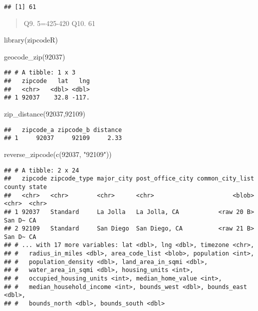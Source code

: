 \documentclass[
]{article}
\newenvironment{Shaded}{\begin{snugshade}}{\end{snugshade}}
\newcommand{\FunctionTok}[1]{\textcolor[rgb]{0.00,0.00,0.00}{#1}}
\newcommand{\NormalTok}[1]{#1}
\newcommand{\StringTok}[1]{\textcolor[rgb]{0.31,0.60,0.02}{#1}}
\begin{document}
\begin{verbatim}
## [1] 61
\end{verbatim}

\begin{quote}
Q9. 5=425-420 Q10. 61
\end{quote}

\begin{Shaded}
\begin{Highlighting}[]
\FunctionTok{library}\NormalTok{(zipcodeR)}
\end{Highlighting}
\end{Shaded}

\begin{Shaded}
\begin{Highlighting}[]
\FunctionTok{geocode\_zip}\NormalTok{(}\StringTok{\textquotesingle{}92037\textquotesingle{}}\NormalTok{)}
\end{Highlighting}
\end{Shaded}

\begin{verbatim}
## # A tibble: 1 x 3
##   zipcode   lat   lng
##   <chr>   <dbl> <dbl>
## 1 92037    32.8 -117.
\end{verbatim}

\begin{Shaded}
\begin{Highlighting}[]
\FunctionTok{zip\_distance}\NormalTok{(}\StringTok{\textquotesingle{}92037\textquotesingle{}}\NormalTok{,}\StringTok{\textquotesingle{}92109\textquotesingle{}}\NormalTok{)}
\end{Highlighting}
\end{Shaded}

\begin{verbatim}
##   zipcode_a zipcode_b distance
## 1     92037     92109     2.33
\end{verbatim}

\begin{Shaded}
\begin{Highlighting}[]
\FunctionTok{reverse\_zipcode}\NormalTok{(}\FunctionTok{c}\NormalTok{(}\StringTok{\textquotesingle{}92037\textquotesingle{}}\NormalTok{, }\StringTok{"92109"}\NormalTok{))}
\end{Highlighting}
\end{Shaded}

\begin{verbatim}
## # A tibble: 2 x 24
##   zipcode zipcode_type major_city post_office_city common_city_list county state
##   <chr>   <chr>        <chr>      <chr>                      <blob> <chr>  <chr>
## 1 92037   Standard     La Jolla   La Jolla, CA           <raw 20 B> San D~ CA   
## 2 92109   Standard     San Diego  San Diego, CA          <raw 21 B> San D~ CA   
## # ... with 17 more variables: lat <dbl>, lng <dbl>, timezone <chr>,
## #   radius_in_miles <dbl>, area_code_list <blob>, population <int>,
## #   population_density <dbl>, land_area_in_sqmi <dbl>,
## #   water_area_in_sqmi <dbl>, housing_units <int>,
## #   occupied_housing_units <int>, median_home_value <int>,
## #   median_household_income <int>, bounds_west <dbl>, bounds_east <dbl>,
## #   bounds_north <dbl>, bounds_south <dbl>
\end{verbatim}
\end{document}

